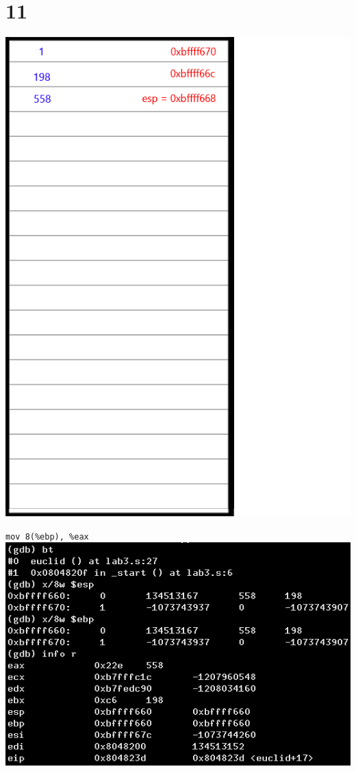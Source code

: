 \documentclass{article}
\begin{document}
\section*{11}
\begin{minipage}{5cm}
\includegraphics[scale=0.3]{s3.png}
\end{minipage}
\begin{minipage}{8cm}
\verb|mov 8(%ebp), %eax|\\
\includegraphics[scale=0.4]{bxi11.png} \\
\end{minipage}
\clearpage
\end{document}
